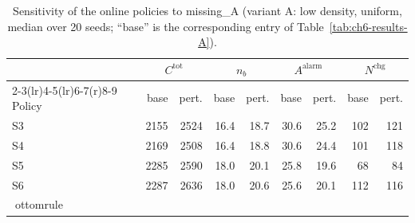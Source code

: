 \begin{table}[htbp]
\centering
\caption{Sensitivity of the online policies to missing_A (variant A: low density, uniform,
median over 20 seeds; ``base'' is the corresponding entry of
Table~\ref{tab:ch6-results-A}).}
\label{tab:ch6-sens-A-missing}
\footnotesize
\begin{tabular}{@{}l rr rr rr rr@{}}
\toprule
& \multicolumn{2}{c}{$C^{\mathrm{tot}}$} & \multicolumn{2}{c}{$n_b$}
  & \multicolumn{2}{c}{$A^{\mathrm{alarm}}$} & \multicolumn{2}{c}{$N^{\mathrm{chg}}$} \\
\cmidrule(r){2-3}\cmidrule(lr){4-5}\cmidrule(lr){6-7}\cmidrule(r){8-9}
Policy & base & pert. & base & pert. & base & pert. & base & pert. \\
\midrule

S3 & 2155 & 2524 & 16.4 & 18.7 & 30.6 & 25.2 & 102 & 121 \\
S4 & 2169 & 2508 & 16.4 & 18.8 & 30.6 & 24.4 & 101 & 118 \\
S5 & 2285 & 2590 & 18.0 & 20.1 & 25.8 & 19.6 & 68 & 84 \\
S6 & 2287 & 2636 & 18.0 & 20.6 & 25.6 & 20.1 & 112 & 116 \\
ottomrule
\end{tabular}
\end{table}
